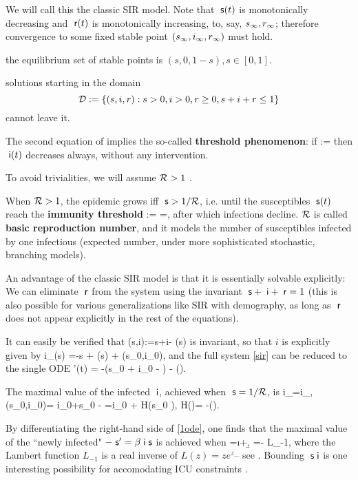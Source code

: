 We will call this the classic SIR model.
Note that
  \BEN \im   $\;\mathsf s(t)$ is monotonically decreasing and $ \; \mathsf r(t)$ is monotonically  increasing, to,  say, $s_\infty, r_\infty$;   therefore  convergence to some fixed stable point $(s_\infty, i_\infty, r_\infty)$ must hold.

  \im
   the equilibrium set of stable points  is
$(s,0,1-s),      s \in [0,1].$

\im solutions starting in the domain
$${\mathcal D}:=\left\{(s,i,r): s>0,i>0,r \geq 0, s+i+r \le 1\right\}$$
    cannot leave it.

\im
The second equation of  implies  the so-called {\bf threshold phenomenon}:
if
 \mR :=\fr{\b}{\g} \ee then $\;\mathsf i(t)$ decreases always, without any intervention.

To  avoid trivialities,  we will assume $\mathcal R >1$ \fno.

\im When $\mathcal R >1$, the    epidemic grows iff $\;\mathsf s > 1/\mathcal R$, i.e. until  the susceptibles $\;\mathsf s(t)$ reach the {\bf immunity threshold}
 \Th:= {\mR}=\fr{\g}{\b},\ee
after which  infections decline. $\mathcal R$ is called {\bf basic reproduction number}, and it models the number of susceptibles infected by one infectious (expected number, under more sophisticated stochastic, branching models).
\EEN

An advantage of the classic SIR model is that it is essentially solvable explicitly:
\BEN
\im
We can eliminate $\; \mathsf r$ from the system using the invariant $\;\mathsf s + \;\mathsf i + \; \mathsf r = 1$ (this is also possible for various generalizations like SIR with demography, as long as $\; \mathsf r$ does not appear explicitly in the rest of the equations).

\im

It can easily be verified that \mu(s,i):=s+i- {\mR}\ln(s)\ee
is  invariant, so that
 $i$ is explicitly given by
 i_{\mR}(s) =-s + {\mR}\ln(s) + \muR(s_0,i_0),\ee
and the full system \eqref{sir} can be reduced to the single ODE
    \s'(t) = -\beta \s(s_0 + i_0 - \s) - \gamma \s \ln\left(\right).
\ee

\im

The  maximal value of the infected $\;\mathsf i$, achieved when $\;\mathsf s=1/\mathcal R$,  is
 i_{\max}=i_{\max,\mR}(s_0,i_0)= i_0+s_0 -   {\mR}  =i_0 + \f{ H(s_0 \mR)}{\mR}, \; H(\mR)= {-\ln(\mR)}.
\ee


\im By differentiating the right-hand side of \eqref{1ode}, one finds that the
maximal value of the ``newly infected" $-\;\mathsf s'=\beta \;\mathsf i \;\mathsf s$ is achieved when
 \s =\i +\fr \g \b, \s=- L_{-1},\ee
where  the Lambert function $L_{-1}$ is a real inverse of $L(z)=z e^z$-- see \fe
\cite{pakes2015lambert,kroger2020analytical,berberan2020exact}.
Bounding $ \;\mathsf s \;\mathsf i$ is one interesting possibility for accomodating  ICU constraints \cite[(2.20)]{Mangat}.


